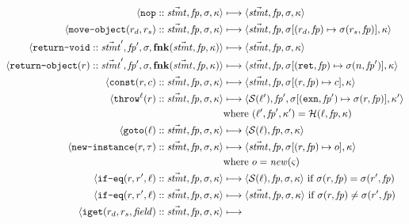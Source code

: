 \documentclass{article}
\newcommand\code[1]{\text{\tt{#1}}}
\newcommand\reg[2]{(#1,#2)}
\newcommand\fp{\mathit{fp}}
\newcommand\fnk{\mathbf{fnk}}
\newcommand\kont{\kappa}
\newcommand\stmts{\vec{\mathit{stmt}}}
\newcommand\store{\sigma}
\newcommand\regid{r}
\newcommand\ret{\code{ret}}
\newcommand\exn{\code{exn}}
\newcommand\getStmts{\mathcal{S}}
\newcommand\handlers{\mathcal{H}}
\newcommand\lab{\ell}
\newcommand\type{\tau}
\newcommand\field{\mathit{field}}
\newcommand\new{\mathit{new}}
\newcommand\state{\varsigma}
\begin{document}
\begin{figure}
\begin{align*}
\langle \code{nop}::\stmts, \fp, \store, \kont \rangle
&\longmapsto
\langle \stmts, \fp, \store, \kont \rangle
\\
\langle \code{move-object}(\regid_d,\regid_s)::\stmts, \fp, \store, \kont \rangle
&\longmapsto
\langle \stmts, \fp, \store[\reg{\regid_d}\fp \mapsto \store\reg{\regid_s}\fp], \kont \rangle
\\
\langle \code{return-void}::\stmts', \fp', \store, \fnk(\stmts,\fp,\kont) \rangle
&\longmapsto
\langle \stmts, \fp, \store, \kont \rangle
\\
\langle \code{return-object}(\regid) :: \stmts', \fp', \store, \fnk(\stmts,\fp,\kont)
\rangle
&\longmapsto
\langle \stmts,\fp,\store[\reg\ret\fp\mapsto \store(n,\fp')],\kont\rangle
\\
\langle \code{const}(\regid,c)::\stmts,\fp,\store,\kont\rangle
&\longmapsto
\langle\stmts,\fp,\store[\reg\regid\fp\mapsto c],\kont\rangle
\\
\langle \code{throw}^\lab(\regid)::\stmts,\fp,\store,\kont\rangle
&\longmapsto
\langle \getStmts(\lab'),\fp',\store[\reg\exn{\fp'}\mapsto \store(\regid,\fp)],\kont'\rangle
\\
&\mbox{where }(\lab',\fp',\kont') = \handlers(\lab,\fp,\kont)
\\
\langle \code{goto}(\lab)::\stmts,\fp,\store,\kont\rangle
&\longmapsto
\langle \getStmts(\lab), \fp,\store,\kont\rangle
\\
\langle \code{new-instance}(\regid,\type)::\stmts,\fp,\store,\kont\rangle
&\longmapsto
\langle \stmts,\fp,\store[\reg\regid\fp \mapsto o],\kont\rangle
\\
&\mbox{where } o = \new(\state)
\\
\langle \code{if-eq}(\regid,\regid',\lab)::\stmts,\fp,\store,\kont\rangle
&\longmapsto
\langle \getStmts(\lab), \fp,\store,\kont\rangle
\text{ if }\store\reg\regid\fp = \store\reg{\regid'}\fp
\\
\langle \code{if-eq}(\regid,\regid',\lab)::\stmts,\fp,\store,\kont\rangle
& \longmapsto
\langle \stmts, \fp,\store,\kont\rangle
\text{ if }\store\reg\regid\fp \neq \store\reg{\regid'}\fp
\\
\langle \code{iget}(\regid_d,\regid_s,\field)::\stmts,\fp,\store,\kont\rangle
&\longmapsto

\end{align*}
\end{figure}
\end{document}
